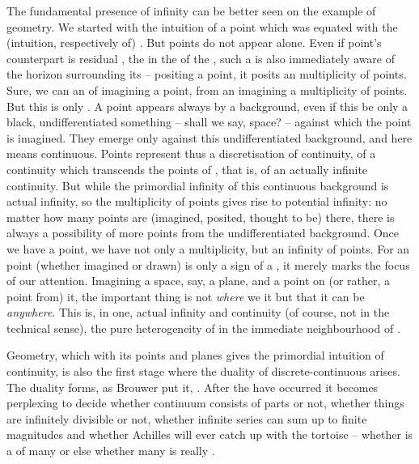 \pa The fundamental presence of infinity can be better seen on the example of geometry.
We started with the intuition of a point which was equated with the
(intuition, respectively   of) .  But points do
not appear alone.  Even if point's counterpart is residual , the
 in the  of the , such a
 is also immediately aware of the  horizon
surrounding its  -- positing a point, it posits an 
multiplicity of points.  Sure, we can  an 
of imagining a point, from an  imagining a multiplicity of points. But
this is only . A point appears always
 by a background, even if this be only a black, undifferentiated
something -- shall we say, space?  -- against which the point is
imagined.
They emerge only against this undifferentiated background, and here
 means continuous.  Points represent thus a discretisation
of continuity, of a continuity which transcends the points of ,
that is, of an actually infinite continuity. But while the primordial infinity
of this continuous background is actual infinity, so the multiplicity of points
gives rise to potential infinity: no matter how many points are (imagined,
posited, thought to be) there, there is always a possibility of 
more points from the undifferentiated background.  Once we have a point, we have
not only a multiplicity, but an infinity of points.  For an  point
(whether imagined or drawn) is only a sign of a , it merely marks the focus of our attention.  Imagining a space, say, a
plane, and  a point on (or rather,  a point from)
it, the important thing is not {\em where} we  it but that it can be
 {\em anywhere}. This is, in one, actual infinity and continuity (of
course, not in the technical sense), the pure heterogeneity of  in the
immediate neighbourhood of .

Geometry, which with its points and planes gives the primordial intuition of
continuity, is also the first stage where the duality of discrete-continuous
arises.  The duality forms, as Brouwer put it, .  After the
 have occurred it becomes perplexing to decide whether
continuum consists of parts or not, whether things are infinitely divisible or
not, whether infinite series can sum up to finite magnitudes and whether
Achilles will ever catch up with the tortoise -- whether  is a
 of many or else whether  many is really .


